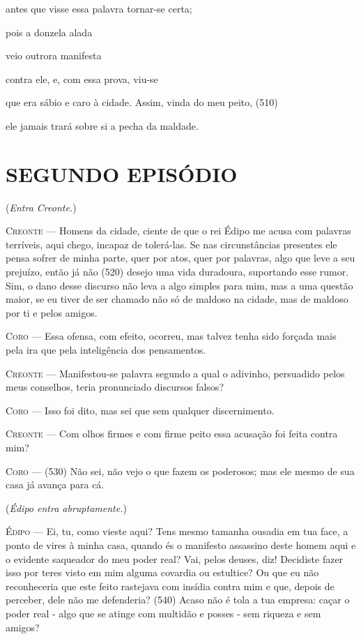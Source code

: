 antes que visse essa palavra tornar-se certa;

pois a donzela alada

veio outrora manifesta

contra ele, e, com essa prova, viu-se

que era sábio e caro à cidade. Assim, vinda do meu peito, (510)

ele jamais trará sobre si a pecha da maldade.

\section{SEGUNDO EPISÓDIO}

(\emph{Entra Creonte.})

\textsc{Creonte} --- Homens da cidade, ciente de que o rei Édipo me acusa com palavras
terríveis, aqui chego, incapaz de tolerá-las. Se nas circunstâncias
presentes ele pensa sofrer de minha parte, quer por atos, quer por
palavras, algo que leve a seu prejuízo, então já não (520) desejo uma
vida duradoura, suportando esse rumor. Sim, o dano desse discurso não
leva a algo simples para mim, mas a uma questão maior, se eu tiver de
ser chamado não só de maldoso na cidade, mas de maldoso por ti e pelos
amigos.

\textsc{Coro} --- Essa ofensa, com efeito, ocorreu, mas talvez tenha sido forçada mais
pela ira que pela inteligência dos pensamentos.

\textsc{Creonte} --- Manifestou-se palavra segundo a qual o adivinho, persuadido pelos meus
conselhos, teria pronunciado discursos falsos?

\textsc{Coro} --- Isso foi dito, mas sei que sem qualquer discernimento.

\textsc{Creonte} --- Com olhos firmes e com firme peito essa acusação foi feita contra mim?

\textsc{Coro} --- (530) Não sei, não vejo o que fazem os poderosos; mas ele mesmo de sua
casa já avança para cá.

(\emph{Édipo entra abruptamente.})

\textsc{Édipo} --- Ei, tu, como vieste aqui? Tens mesmo tamanha ousadia em tua face, a
ponto de vires à minha casa, quando és o manifesto assassino deste homem
aqui e o evidente saqueador do meu poder real? Vai, pelos deuses, diz!
Decidiste fazer isso por teres visto em mim alguma covardia ou
estultice? Ou que eu não reconheceria que este feito rastejava com
insídia contra mim e que, depois de perceber, dele não me defenderia?
(540) Acaso não é tola a tua empresa: caçar o poder real - algo que se
atinge com multidão e posses - sem riqueza e sem amigos?

